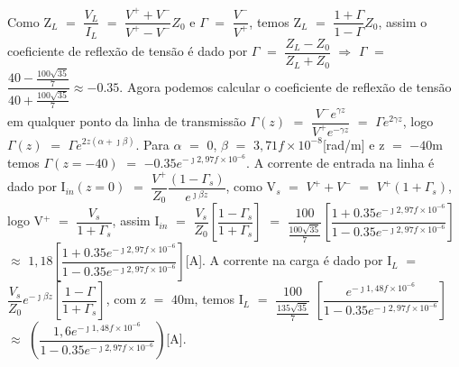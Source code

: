 \begin{enumerate}[1.]
Como Z$_{L}$ $=$ $\dfrac{V_{L}}{I_{L}}$ $=$ $\dfrac{V^{+} + V^{-}}{V^{+} - V^{-}}Z_{0}$ e $\Gamma$ $=$ $\dfrac{V^{-}}{V^{+}}$, temos Z$_{L}$ $=$ $\dfrac{1 + \Gamma}{1 - \Gamma}Z_{0}$, assim o coeficiente de reflexão de tensão é dado por $\Gamma$ $=$ $\dfrac{Z_{L} - Z_{0}}{Z_{L} + Z_{0}}$ $\Rightarrow$ $\Gamma$ $=$ $\dfrac{40 - \frac{100\sqrt{35}}{7}}{40 + \frac{100\sqrt{35}}{7}} \approx -0.35$. Agora podemos calcular o coeficiente de reflexão de tensão em qualquer ponto da linha de transmissão $\Gamma(z)$ $=$ $\dfrac{V^{-}e^{\gamma z}}{V^{+}e^{-\gamma z}}$ $=$ $\Gamma e^{2\gamma z}$, logo $\Gamma(z)$ $=$ $\Gamma e^{2z(\alpha + \jmath \beta)}$. Para $\alpha$ $=$ $0$, $\beta$ $=$ $3,71f \times 10^{-8}$[\si{\radian/\meter}] e z $=$ $-40$\si{\meter} temos $\Gamma(z = -40)$ $=$ $-0.35 e^{-\jmath 2,97f \times 10^{-6}}$. A corrente de entrada na linha é dado por I$_{in}(z = 0)$ $=$ $\dfrac{V^{+}}{Z_{0}}\dfrac{(1 - \Gamma_{s})}{e^{\jmath \beta z}}$, como V$_{s}$ $=$ $V^{+} + V^{-}$ $=$ $V^{+}(1 + \Gamma_{s})$, logo V$^{+}$ $=$ $\dfrac{V_{s}}{1 + \Gamma_{s}}$, assim I$_{in}$ $=$ $\dfrac{V_{s}}{Z_{0}}\left[\dfrac{1 - \Gamma_{s}}{1 + \Gamma_{s}}\right]$ $=$ $\dfrac{100}{\frac{100\sqrt{35}}{7}}$$\left[\dfrac{1 + 0.35 e^{-\jmath 2,97f \times 10^{-6}}}{1 - 0.35 e^{-\jmath 2,97f \times 10^{-6}}}\right]$ $\approx$ $1,18\left[\dfrac{1 + 0.35 e^{-\jmath 2,97f \times 10^{-6}}}{1 - 0.35 e^{-\jmath 2,97f \times 10^{-6}}}\right]$[\si{\ampere}]. A corrente na carga é dado por I$_{L}$ $=$ $\dfrac{V_{s}}{Z_{0}}e^{-\jmath\beta z}\left[\dfrac{1 - \Gamma}{1 + \Gamma_{s}}\right]$, com z $=$ $40$\si{\meter}, temos I$_{L}$ $=$ $\dfrac{100}{\frac{135\sqrt{35}}{7}}$ $\left[\dfrac{e^{-\jmath 1,48f \times 10^{-6}}}{1 - 0.35 e^{-\jmath 2,97f \times 10^{-6}}}\right]$ $\approx$ $\left(\dfrac{1,6e^{-\jmath 1,48f \times 10^{-6}}}{1 - 0.35 e^{-\jmath 2,97f \times 10^{-6}}}\right)$[\si{\ampere}].
%
\begin{figure}[!htb]
\centering
{}
\end{figure}$$
\end{enumerate}
